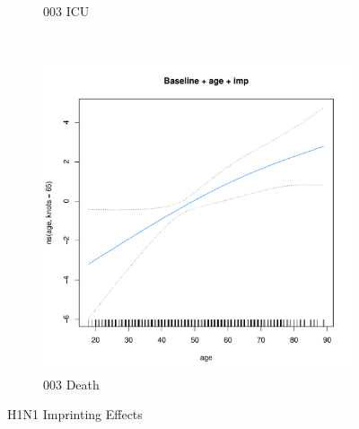 \documentclass[12pt,twoside]{article}
\begin{document}
\begin{figure}[h]
{\begin{subfigure}{.49\linewidth}
                \caption{003 ICU}
        \end{subfigure}\\
        \begin{subfigure}{.49\linewidth}
                \includegraphics[width=\textwidth, page=2]{003Death_H1N1}
                \caption{003 Death}
        \end{subfigure}

        } 
        \caption{H1N1 Imprinting Effects}\label{reduced}

\par\bigskip
\par\bigskip
\par\bigskip
\par\bigskip


\end{figure}
\end{document}
